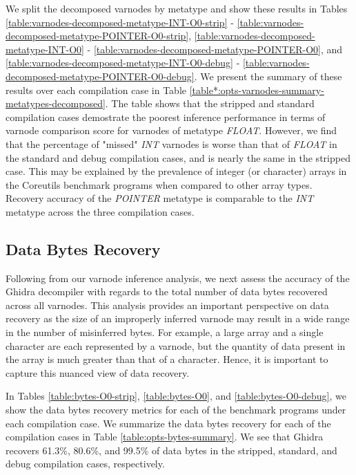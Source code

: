 \documentclass[conference]{IEEEtran}
\begin{document}
We split the decomposed varnodes by metatype and show these results in Tables \ref{table:varnodes-decomposed-metatype-INT-O0-strip} - \ref{table:varnodes-decomposed-metatype-POINTER-O0-strip}, \ref{table:varnodes-decomposed-metatype-INT-O0} - \ref{table:varnodes-decomposed-metatype-POINTER-O0}, and \ref{table:varnodes-decomposed-metatype-INT-O0-debug} - \ref{table:varnodes-decomposed-metatype-POINTER-O0-debug}. We present the summary of these results over each compilation case in Table \ref{table*:opts-varnodes-summary-metatypes-decomposed}. The table shows that the stripped and standard compilation cases demostrate the poorest inference performance in terms of varnode comparison score for varnodes of metatype \emph{FLOAT}. However, we find that the percentage of "missed" \emph{INT} varnodes is worse than that of \emph{FLOAT} in the standard and debug compilation cases, and is nearly the same in the stripped case. This may be explained by the prevalence of integer (or character) arrays in the Coreutils benchmark programs when compared to other array types. Recovery accuracy of the \emph{POINTER} metatype is comparable to the \emph{INT} metatype across the three compilation cases.

\subsection{Data Bytes Recovery}

Following from our varnode inference analysis, we next assess the accuracy of the Ghidra decompiler with regards to the total number of data bytes recovered across all varnodes. This analysis provides an important perspective on data recovery as the size of an improperly inferred varnode may result in a wide range in the number of misinferred bytes. For example, a large array and a single character are each represented by a varnode, but the quantity of data present in the array is much greater than that of a character. Hence, it is important to capture this nuanced view of data recovery.



In Tables \ref{table:bytes-O0-strip}, \ref{table:bytes-O0}, and \ref{table:bytes-O0-debug}, we show the data bytes recovery metrics for each of the benchmark programs under each compilation case. We summarize the data bytes recovery for each of the compilation cases in Table \ref{table:opts-bytes-summary}. We see that Ghidra recovers 61.3\%, 80.6\%, and 99.5\% of data bytes in the stripped, standard, and debug compilation cases, respectively.
\end{document}
